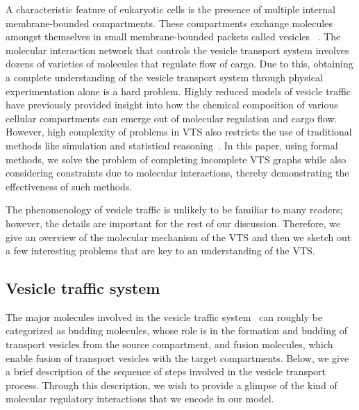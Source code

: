 \noindent A characteristic feature of eukaryotic cells is the presence of multiple internal membrane-bounded compartments. 
%
These compartments exchange molecules amongst themselves in small membrane-bounded packets called vesicles ~\cite{alberts2002molecular}. 
%
The molecular interaction network that controls the vesicle transport system involves dozens of varieties of molecules that regulate flow of cargo. 
%
Due to this, obtaining a complete understanding of the vesicle transport system through physical experimentation alone is a hard problem.
%
Highly reduced models of vesicle traffic have previously provided insight into how the chemical composition of various cellular compartments can emerge out of molecular regulation and cargo flow. 
%
However, high complexity of problems in VTS also restricts the use of traditional methods like simulation and statistical reasoning~\cite{mani2016wine, mani2016stacking}. 
In this paper, using formal methods, we solve the problem of completing incomplete VTS graphs while also considering constraints due to molecular interactions, thereby demonstrating the effectiveness of such methods.

The phenomenology of vesicle traffic is unlikely to be familiar to many readers; however, the details are important for the rest of our discussion. 
%
Therefore, we give an overview of the molecular mechanism of the VTS and then we sketch out a few interesting problems that are key to an understanding of the VTS.

\subsection{Vesicle traffic system}
\noindent The major molecules involved in the vesicle traffic system~\cite{wells2005discovery} can roughly be categorized as budding molecules, whose role is in the formation and budding of transport vesicles from the source compartment, and fusion molecules, which enable fusion of transport vesicles with the target compartments. 
%
Below, we give a brief description of the sequence of steps involved in the vesicle transport process. 
%
Through this description, we wish to provide a glimpse of the kind of molecular regulatory interactions that we encode in our model.
 
